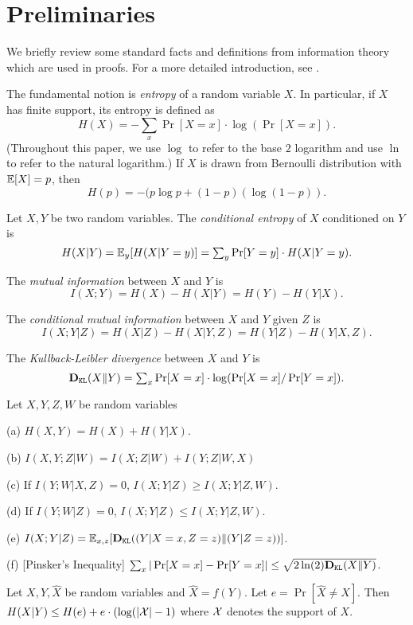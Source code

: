 \section{Preliminaries}


We briefly review some standard facts and definitions from information theory which are used in proofs. For a more detailed introduction, see \cite{CK11}. 

The fundamental notion is \emph{entropy} of a random variable $X$. In particular, if $X$ has finite support, its entropy is defined as 
\[ H(X) = \textstyle - \sum_{x} \Pr[X = x]\cdot  \log(\Pr[X = x]). \]
(Throughout this paper, we use $\log$ to refer to the base $2$ logarithm and use $\ln$ to refer to the natural logarithm.) If $X$ is drawn from Bernoulli distribution with $\mathbb{E}[X]=p$, then 
    \[ H(p) = -(p\log p + (1-p)(\log(1-p)). \]

Let $X,Y$ be two random variables. The \emph{conditional entropy} of $X$ conditioned on $Y$ is 
\[ H(X|Y) 
    = \mathbb{E}_y[H(X|Y = y)] 
    = \textstyle \sum_{y} \Pr[Y=y]\cdot H(X|Y = y). \]

The \emph{mutual information} between $X$ and $Y$ is 
\[ I(X;Y) = H(X) - H(X|Y) = H(Y) - H(Y|X).\]

The \emph{conditional mutual information} between $X$ and $Y$ given $Z$ is  
\[ I(X;Y|Z) = H(X|Z) - H(X|Y,Z) = H(Y|Z) - H(Y|X,Z).\]


The \emph{Kullback-Leibler divergence} between $X$ and $Y$ is 
\[ \textbf{D}_{\mathtt{KL}}(X\| Y)\textstyle  = \sum_x \Pr[X = x] \cdot \log(\Pr[X = x] / \Pr[Y = x]).\]


\begin{lemma}
Let $X,Y,Z,W$ be random variables 
\begin{OneLiners}
\item[(a)] $H(X,Y) = H(X) + H(Y|X)$.
\item[(b)] $I(X,Y;Z|W) = I(X;Z|W) + I(Y;Z|W,X)$
\item[(c)] If $I(Y;W|X,Z) = 0$, $I(X;Y|Z) \geq I(X;Y|Z,W)$.
\item[(d)] If $I(Y;W|Z) = 0$, $I(X;Y|Z) \leq I(X;Y|Z,W)$.
\item[(e)] $I(X;Y|Z) = \mathbb{E}_{x,z}[\textbf{D}_{\mathtt{KL}}((Y|X = x, Z=z)\|(Y|Z=z))]$.
\item[(f)] [Pinsker's Inequality] $\sum_x | \Pr[X=x] - \Pr[Y=x]| \leq \sqrt{2 \ln(2) \textbf{D}_{\mathtt{KL}}(X\|Y)}$.
\end{OneLiners}
\end{lemma}

\begin{lemma}
Let $X,Y,\hat{X}$ be random variables and $\hat{X} = f(Y)$. Let $e = \Pr[\hat{X} \neq X]$. Then $H(X|Y) \leq H(e) + e \cdot (\log(|\mathcal{X}|-1)$ where $\mathcal{X}$ denotes the support of $X$.
\end{lemma} 